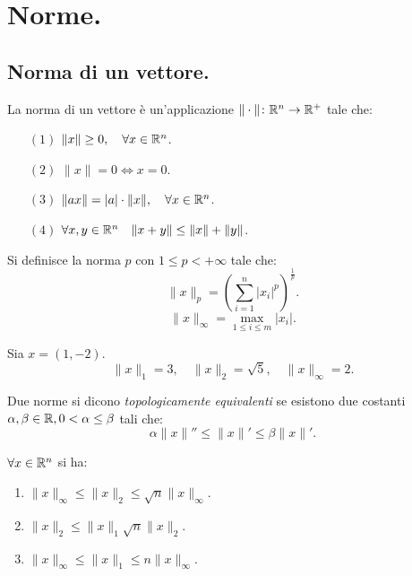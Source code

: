 
\chapter{Norme.}
\section{Norma di un vettore.}
La norma di un vettore è un'applicazione $\|\cdot\| \colon \mathbb{R}^n \to \mathbb{R}^+$
tale che:
\begin{itemize}
\item[$(1)$]$\|x\| \geq 0, \quad \forall x \in \mathbb{R}^n$.
\item[$(2)$]$\|x\| = 0 \Leftrightarrow x = 0$.
\item[$(3)$]$\|ax\| = |a|\cdot\|x\|, \quad \forall x \in \mathbb{R}^n$.
\item[$(4)$]$\forall x,y \in \mathbb{R}^n \quad \|x+y\| \leq \|x\| + \|y\|$.
\end{itemize}

\begin{defi}Si definisce la
norma $p$ con $1 \leq p < +\infty$ tale che:
\[\|x\|_p = \left(\sum_{i=1}^n|x_i|^p \right)^{\frac{1}{p}}.\]
\[\|x\|_\infty = \max_{1 \leq i \leq m}|x_i|.\]
\end{defi}

\begin{exe}
Sia $x = (1, -2)$.
\[\|x\|_1 = 3, \quad \|x\|_2 = \sqrt{5}, \quad \|x\|_\infty = 2.\]
\end{exe}

\begin{defi}Due norme si dicono \emph{topologicamente equivalenti} se
esistono due costanti $\alpha, \beta \in \mathbb{R}, 0 < \alpha \leq \beta$ tali che:
\[
\alpha \|x\|'' \leq \|x\|' \leq \beta\|x\|'.
\] 
\end{defi}

\begin{teo}
$\forall x \in \mathbb{R}^n$ si ha:
\begin{enumerate}
\item $\|x\|_\infty \leq \|x\|_2 \leq \sqrt{n}\|x\|_\infty$.
\item $\|x\|_2 \leq \|x\|_1 \sqrt{n}\|x\|_2$.
\item $\|x\|_\infty \leq \|x\|_1 \leq n\|x\|_\infty$.
\end{enumerate}
\end{teo}

